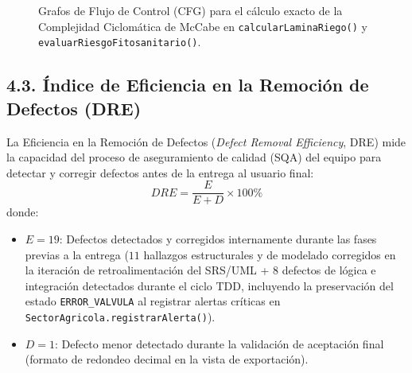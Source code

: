 \documentclass[12pt,letterpaper]{report}
\begin{document}
\begin{figure}[H]
{{}}
    \small
    \caption{Grafos de Flujo de Control (CFG) para el cálculo exacto de la Complejidad Ciclomática de McCabe en \texttt{calcularLaminaRiego()} y \texttt{evaluarRiesgoFitosanitario()}.}
    \label{fig:cfg-mccabe}
\end{figure}

\subsection*{4.3. Índice de Eficiencia en la Remoción de Defectos (DRE)}

La Eficiencia en la Remoción de Defectos (\textit{Defect Removal Efficiency}, DRE) mide la capacidad del proceso de aseguramiento de calidad (SQA) del equipo para detectar y corregir defectos antes de la entrega al usuario final:
\[
    DRE = \frac{E}{E + D} \times 100\%
\]
donde:
\begin{itemize}
    \item $E = 19$: Defectos detectados y corregidos internamente durante las fases previas a la entrega ($11$ hallazgos estructurales y de modelado corregidos en la iteración de retroalimentación del SRS/UML + $8$ defectos de lógica e integración detectados durante el ciclo TDD, incluyendo la preservación del estado \texttt{ERROR\_VALVULA} al registrar alertas críticas en \texttt{SectorAgricola.registrarAlerta()}).
    \item $D = 1$: Defecto menor detectado durante la validación de aceptación final (formato de redondeo decimal en la vista de exportación).
\end{itemize}
\end{document}
